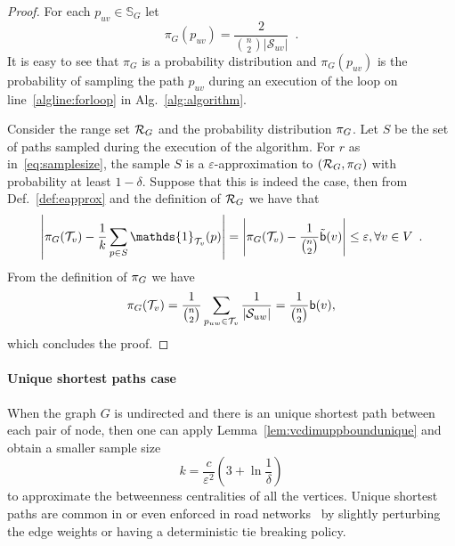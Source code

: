 \begin{proof}
  For each $p_{uv}\in\mathbb{S}_G$ let
  \[
  \pi_G(p_{uv})=\frac{2}{\binom{n}{2}|\mathcal{S}_{uv}|}\enspace.
  \]
  It is easy to see that $\pi_G$ is a probability distribution and
  $\pi_G(p_{uv})$ is the probability of sampling the path $p_{uv}$ during an
  execution of the loop on line~\ref{algline:forloop} in
  Alg.~\ref{alg:algorithm}.
  
  Consider the range set $\mathcal{R}_G$ and the probability distribution $\pi_G$.
  Let $S$ be the set of paths sampled during the execution of the algorithm.
  For $r$ as in~\eqref{eq:samplesize}, the sample $S$ is a
  $\varepsilon$-approximation to $(\mathcal{R}_G,\pi_G)$ with probability at least
  $1-\delta$. Suppose that this is indeed the case, then from
  Def.~\ref{def:eapprox} and the definition of $\mathcal{R}_G$ we have that
  \[
  \left|\prob_G(\mathcal{T}_v) - \frac{1}{k}\sum_{p\in
  S}\mathds{1}_{\mathcal{T}_v}(p)\right|=\left|\prob_G(\mathcal{T}_v) -
  \frac{1}{\binom{n}{2}}\tilde\betw(v)\right|\le\varepsilon, \forall v\in
  V\enspace.
  \]
  From the definition of $\pi_G$ we have
  \[
  \pi_G(\mathcal{T}_v)=\frac{1}{\binom{n}{2}}\sum_{p_{uw}\in\mathcal{T}_v}\frac{1}{|\mathcal{S}_{uw}|}=\frac{1}{\binom{n}{2}}\mathsf{b}(v),
  \]
  which concludes the proof.
\end{proof}

\paragraph{Unique shortest paths case} When the graph $G$ is undirected and
there is an unique shortest path between each pair of node, then one can apply
Lemma~\ref{lem:vcdimuppboundunique} and obtain a smaller sample size
\[ k= \frac{c}{\varepsilon^2}\left(3+\ln\frac{1}{\delta}\right)
\]
to approximate the betweenness centralities of all the vertices. Unique shortest
paths are common in or even enforced in road networks~\citep{GeisbergerSS08} by
slightly perturbing the edge weights or having a deterministic tie breaking
policy.

